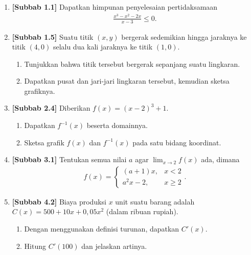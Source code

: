 \documentclass[10pt,openany,a4paper]{article}
\theoremstyle{definition}
\theoremstyle{definition}
\theoremstyle{plain}
\begin{document}
\begin{enumerate}
    \item \textbf{[Subbab 1.1]} Dapatkan himpunan penyelesaian pertidaksamaan
    \begin{align*}
        \frac{x^3-x^2-2x}{x-3}\leq 0.
    \end{align*}

    \item \textbf{[Subbab 1.5]} Suatu titik $(x,y)$ bergerak sedemikian hingga jaraknya ke titik $(4,0)$ selalu dua kali jaraknya ke titik $(1,0)$.
    \begin{enumerate}
        \item Tunjukkan bahwa titik tersebut bergerak sepanjang suatu lingkaran.
        \item Dapatkan pusat dan jari-jari lingkaran tersebut, kemudian sketsa grafiknya.
    \end{enumerate}

    \item \textbf{[Subbab 2.4]} Diberikan $f(x)=(x-2)^3+1$.
    \begin{enumerate}
        \item Dapatkan $f^{-1}(x)$ beserta domainnya.
        \item Sketsa grafik $f(x)$ dan $f^{-1}(x)$ pada satu bidang koordinat.
    \end{enumerate}

    \item \textbf{[Subbab 3.1]} Tentukan semua nilai $a$ agar $\displaystyle\lim_{x\to 2}f(x)$ ada, dimana
    \begin{align*}
        f(x)=\begin{cases}
            (a+1)x, & x<2\\
            a^2x-2, & x\geq 2
        \end{cases}.
    \end{align*}

    \item \textbf{[Subbab 4.2]} Biaya produksi $x$ unit suatu barang adalah $C(x)=500+10x+0{,}05x^2$ (dalam ribuan rupiah).
    \begin{enumerate}
        \item Dengan menggunakan definisi turunan, dapatkan $C'(x)$.
        \item Hitung $C'(100)$ dan jelaskan artinya.
    \end{enumerate}
\end{enumerate}
\end{document}
